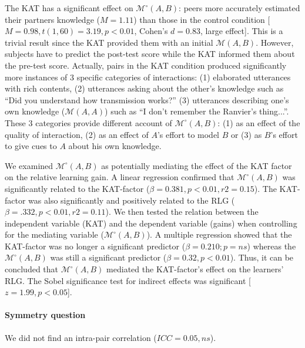 \documentclass[natbib]{svjour3}
\newcommand{\gmodel}[2]{{$\mathcal{M}(#1, #2)$}}
\newcommand{\gModel}[2]{{$\mathcal{M}^{\circ}(#1, #2)$}}
\begin{document}
The KAT has a significant effect on \gModel{A}{B}: peers more accurately
estimated their partners knowledge ($M = 1.11$) than those in the control
condition [$M = 0.98, t(1, 60) = 3.19, p < 0.01$, Cohen's $d = 0.83$, large
effect]. This is a trivial result since the KAT provided them with an initial
\gmodel{A}{B}. However, subjects have to predict the post-test score while the
KAT informed them about the pre-test score. Actually, pairs in the KAT condition
produced significantly more instances of 3 specific categories of interactions:
(1) elaborated utterances with rich contents,  (2) utterances asking about the
other's knowledge such as ``Did you understand how transmission works?'' (3)
utterances describing one's own knowledge (\gmodel{A}{A}) such as ``I don't
remember the Ranvier's thing...''. These 3 categories provide different account
of \gModel{A}{B}: (1) as an effect of the quality of interaction, (2) as an
effect of $A$'s effort to model $B$ or (3) as $B$'s effort to give cues to $A$ about his
own knowledge.

We examined \gModel{A}{B} as potentially mediating the effect of the KAT factor
on the relative learning gain. A linear regression confirmed that \gModel{A}{B}
was significantly related to the KAT-factor ($\beta= 0.381, p < 0.01, r2 = 0.15$).
The KAT-factor was also significantly and positively related to the RLG ($\beta=
.332, p < 0.01, r2 = 0.11$). We then tested the relation between the independent
variable (KAT) and the dependent variable (gains) when controlling for the
mediating variable (\gModel{A}{B}). A multiple regression showed that the
KAT-factor was no longer a significant predictor ($\beta= 0.210; p = ns$) whereas
the \gModel{A}{B} was still a significant predictor ($\beta= 0.32, p < 0.01$).
Thus, it can be concluded that \gModel{A}{B} mediated the KAT-factor's effect on
the learners' RLG. The Sobel significance test for indirect effects was
significant [$z = 1.99, p < 0.05$]. 

\paragraph{Symmetry question} We did not find an intra-pair correlation ($ICC =
0.05, ns$).

\end{document}
